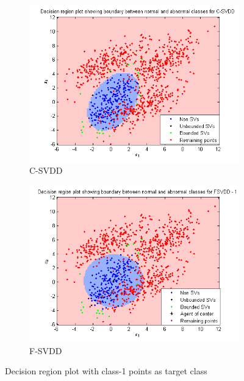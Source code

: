 \documentclass{article} %
\begin{document}
\begin{figure}[H]
\begin{subfigure}{.5\textwidth}
  \centering
  \includegraphics[width=\linewidth]{Plots/overlapping/svdd/decn_1}
\caption{C-SVDD} 
\end{subfigure}%
\begin{subfigure}{.5\textwidth}
  \centering
  \includegraphics[width=\linewidth]{Plots/overlapping/fsvdd/decn_1}
\caption{F-SVDD} 
\end{subfigure}
\caption{Decision region plot with class-1 points as target class} 
\end{figure}
\end{document}

